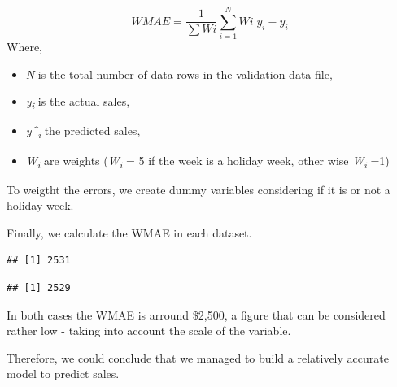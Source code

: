 \documentclass[11pt,]{article}
\newenvironment{Shaded}{\begin{snugshade}}{\end{snugshade}}
\newcommand{\KeywordTok}[1]{\textcolor[rgb]{0.13,0.29,0.53}{\textbf{{#1}}}}
\newcommand{\StringTok}[1]{\textcolor[rgb]{0.31,0.60,0.02}{{#1}}}
\newcommand{\CommentTok}[1]{\textcolor[rgb]{0.56,0.35,0.01}{\textit{{#1}}}}
\newcommand{\NormalTok}[1]{{#1}}
\providecommand{\tightlist}{%
  \setlength{\itemsep}{0pt}\setlength{\parskip}{0pt}}
\begin{document}
\[WMAE = \frac{1}{\sum{W}i}\sum_{i=1}^N{W}i\left\lvert{y_{i}-\hat{y}_{i}}\right\rvert\]
Where,

\begin{itemize}
\tightlist
\item
  \emph{N} is the total number of data rows in the validation data file,
\item
  \emph{y\textsubscript{i}} is the actual sales,
\item
  \emph{y\^{}\textsubscript{i}} the predicted sales,
\item
  \emph{W\textsubscript{i}} are weights (\emph{W\textsubscript{i}} = 5
  if the week is a holiday week, other wise \emph{W\textsubscript{i}}
  =1)
\end{itemize}

To weigtht the errors, we create dummy variables considering if it is or
not a holiday week.

Finally, we calculate the WMAE in each dataset.

\begin{Shaded}
\end{Shaded}

\begin{verbatim}
## [1] 2531
\end{verbatim}

\begin{Shaded}
\end{Shaded}

\begin{verbatim}
## [1] 2529
\end{verbatim}

In both cases the WMAE is arround \$2,500, a figure that can be
considered rather low - taking into account the scale of the variable.

Therefore, we could conclude that we managed to build a relatively
accurate model to predict sales.
\end{document}
